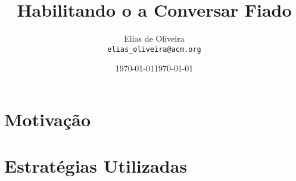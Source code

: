 \documentclass[12pt,a4paper,portuguese]{article}
\title{Habilitando o {\rava} a Conversar Fiado}
\author{Elias de Oliveira\\
        {\tt elias\_oliveira@acm.org}}
\date{\today}
\begin{document}
\date{\today}
\pagestyle{empty}
\maketitle

\section{Motivação}
\label{introducao}


\section{Estratégias Utilizadas}




\end{document}
